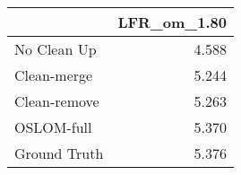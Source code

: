 \begin{tabular}{lr}
\toprule
{} & LFR_om_1.80 \\
\midrule
No Clean Up  &       4.588 \\
Clean-merge  &       5.244 \\
Clean-remove &       5.263 \\
OSLOM-full   &       5.370 \\
Ground Truth &       5.376 \\
\bottomrule
\end{tabular}

